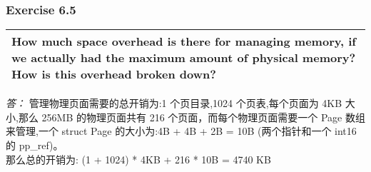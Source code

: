 \documentclass[11pt,a4paper]{article}
\begin{document}
\subsubsection{Exercise 6.5}
\begin{tabular}{|p{\textwidth}|}
\hline
How much space overhead is there for managing memory, if we actually had the maximum amount of physical memory? How is this overhead broken down? \\
\hline
\end{tabular}
\textit{\large{答：}}
管理物理页面需要的总开销为:1 个页目录,1024 个页表,每个页面为 4KB 大小,那么 256MB 的物理页面共有 216 个页面，而每个物理页面需要一个 Page 数组来管理,一个 struct Page 的大小为:4B + 4B + 2B = 10B (两个指针和一个 int16 的 pp\_ref)。\\
那么总的开销为: (1 + 1024) * 4KB + 216 * 10B = 4740 KB\\
\end{document}
